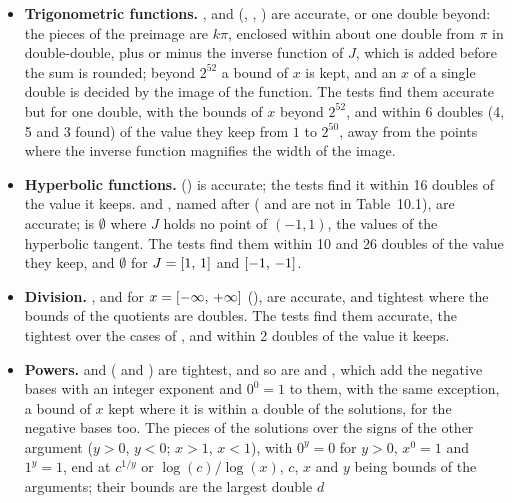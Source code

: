 \begin{itemize}
  $x=\itv{0}{\code{DBL\_MAX}}$ is $\itv{\code{DBL\_MAX}}{\code{DBL\_MAX}}$.
\item[$\bullet$] \textbf{Trigonometric functions.} ,
   and  (, ,
  ) are accurate, or one double beyond: the pieces of the
  preimage are $k\pi$, enclosed within about one double from $\pi$ in
  double-double, plus or minus the inverse function of $J$, which is added
  before the sum is rounded; beyond $2^{52}$ a bound of $x$ is kept, and an
  $x$ of a single double is decided by the image of the function. The tests
  find them accurate but for one double, with the bounds of $x$ beyond
  $2^{52}$, and within 6 doubles (4, 5 and 3 found) of the value they keep
  from $1$ to $2^{50}$, away from the points where the inverse function
  magnifies the width of the image.
\item[$\bullet$] \textbf{Hyperbolic functions.} 
  () is accurate; the tests find it within 16 doubles of the
  value it keeps.  and , named after
   ( and  are not in Table~10.1),
  are accurate;  is $\emptyset$ where $J$ holds no
  point of $(-1, 1)$, the values of the hyperbolic tangent.\newinvfive{}
  The tests find them within 10 and 26 doubles of the value they keep, and
  $\emptyset$ for $J=[1,\,1]$ and $[-1,\,-1]$.
\item[$\bullet$] \textbf{Division.} , and
   for $x=[-\infty,\,+\infty]$ (), are
  accurate, and tightest where the bounds of the quotients are doubles. The
  tests find them accurate, the tightest over the cases of \code{\%}, and
   within 2 doubles of the value it keeps.
\item[$\bullet$] \textbf{Powers.}\newinvfive{}  and
   ( and
  ) are tightest, and so are
   and , which add
  the negative bases with an integer exponent and $0^0=1$ to them, with the
  same exception, a bound of $x$ kept where it is within a double of the
  solutions, for the negative bases too. The pieces of the solutions over the signs of the other
  argument ($y>0$, $y<0$; $x>1$, $x<1$), with $0^y=0$ for $y>0$, $x^0=1$
  and $1^y=1$, end at $c^{1/y}$ or $\log(c)/\log(x)$, $c$, $x$ and $y$
  being bounds of the arguments; their bounds are the largest double $d$

\end{itemize}
